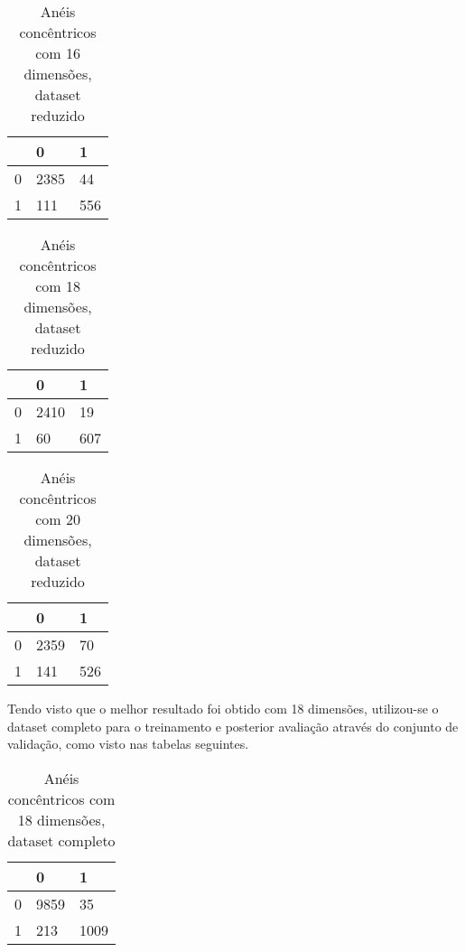 \begin{table}[h]
\centering
\caption{Anéis concêntricos com 16 dimensões, dataset reduzido}
\begin{tabular}{l|l|l|}
\cline{2-3}
                        & 0 & 1 \\ \hline
\multicolumn{1}{|l|}{0} & 2385 & 44 \\ \hline
\multicolumn{1}{|l|}{1} & 111 & 556 \\ \hline
\end{tabular}
\end{table}

\begin{table}[h]
\centering
\caption{Anéis concêntricos com 18 dimensões, dataset reduzido}
\begin{tabular}{l|l|l|}
\cline{2-3}
                        & 0 & 1 \\ \hline
\multicolumn{1}{|l|}{0} & 2410 & 19 \\ \hline
\multicolumn{1}{|l|}{1} & 60 & 607 \\ \hline
\end{tabular}
\end{table}

\begin{table}[h!]
\centering
\caption{Anéis concêntricos com 20 dimensões, dataset reduzido}
\begin{tabular}{l|l|l|}
\cline{2-3}
                        & 0 & 1 \\ \hline
\multicolumn{1}{|l|}{0} & 2359 & 70 \\ \hline
\multicolumn{1}{|l|}{1} & 141 & 526 \\ \hline
\end{tabular}
\end{table}

Tendo visto que o melhor resultado foi obtido com 18 dimensões, utilizou-se o dataset completo para o treinamento e posterior avaliação através do conjunto de validação, como visto nas tabelas seguintes.

\begin{table}[h!]
\centering
\caption{Anéis concêntricos com 18 dimensões, dataset completo}
\begin{tabular}{l|l|l|}
\cline{2-3}
                        & 0 & 1 \\ \hline
\multicolumn{1}{|l|}{0} & 9859 & 35 \\ \hline
\multicolumn{1}{|l|}{1} & 213 & 1009 \\ \hline
\end{tabular}
\end{table}

